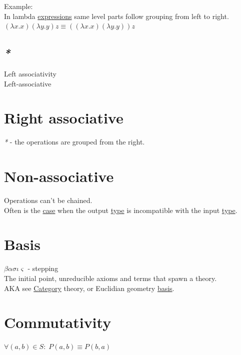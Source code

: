 \documentclass[a4paper,14pt,oneside]{book}
\begin{document}
Example:\\
In lambda \hyperref[org8896d2c]{expressions} same level parts follow grouping from left to right.\\
\((\lambda x . x)(\lambda y . y)z \equiv ((\lambda x . x)(\lambda y . y))z\)\\

\subsection{\emph{*}}
\label{sec:org31e4f57}

\label{org4589de4}Left associativity\\
\label{org4098b14}Left-associative\\

\section{\label{org696ddb3}Right associative}
\label{sec:org43e4ef8}
\emph{*} - the operations are grouped from the right.\\

\section{\label{orgead3e34}Non-associative}
\label{sec:orgf81530a}
Operations can't be chained.\\

Often is the \hyperref[orge2ba09c]{case} when the output \hyperref[orgd6db20c]{type} is incompatible with the input \hyperref[orgd6db20c]{type}.\\

\section{\label{orge8a5e35}Basis}
\label{sec:org108dcf2}
\(\beta\alpha\sigma\iota\varsigma\) - stepping\\

The initial point, unreducible axioms and terms that spawn a theory.\\
AKA see \hyperref[org841d8bc]{Category} theory, or Euclidian geometry \hyperref[orge8a5e35]{basis}.\\

\section{\label{orgb4c5d86}Commutativity}
\label{sec:org6029291}
\(\forall (a,b) \in S : \; P(a,b) \equiv P(b,a)\)\\
\end{document}
